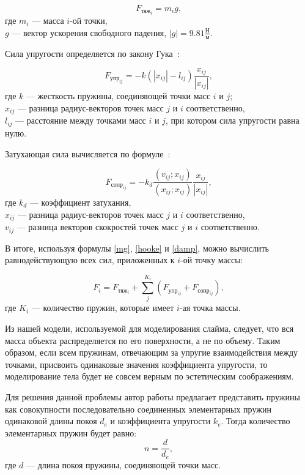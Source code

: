 \begin{equation}\label{mg}
	F_{\text{тяж}_i} = m_i g,
\end{equation}
где $m_i$ --- масса $i$-ой точки,\\
\text{~~~~~~} $g$ --- вектор ускорения свободного падения, $|g| = 9.81 \frac{\text{Н}}{\text{м}}$.

Сила упругости определяется по закону Гука~\cite{muller}:

\begin{equation}\label{hooke}
	F_{\text{упр}_{ij}} = -k (|x_{ij}| - l_{ij}) \frac{x_{ij}}{|x_{ij}|},
\end{equation}
где $k$ --- жесткость пружины, соединяющей точки масс $i$ и $j$;\\
\text{~~~~~~}$x_{ij}$ --- разница радиус-векторов точек масс $j$ и $i$ соответственно,\\
\text{~~~~~~}$l_{ij}$ --- расстояние между точками масс $i$ и $j$, при котором сила упругости равна нулю.

Затухающая сила вычисляется по формуле~\cite{muller}:

\begin{equation}\label{damp}
	F_{\text{сопр}_{ij}} = -k_d \frac{(v_{ij}; x_{ij})}{(x_{ij}; x_{ij})} \frac{x_{ij}}{|x_{ij}|},
\end{equation}
где $k_d$ --- коэффициент затухания,\\
\text{~~~~~~}$x_{ij}$ --- разница радиус-векторов точек масс $j$ и $i$ соответственно,\\
\text{~~~~~~}$v_{ij}$ --- разница векторов скокростей точек масс $j$ и $i$ соответственно.

В итоге, используя формулы \eqref{mg}, \eqref{hooke} и \eqref{damp}, можно вычислить равнодействующую всех сил, приложенных к $i$-ой точку массы:

\begin{equation}\label{f}
	F_i = F_{\text{тяж}_i} + \sum_{j}^{K_i} (F_{\text{упр}_{ij}} + F_{\text{сопр}_{ij}}),
\end{equation}
где $K_i$ --- количество пружин, которые имеет $i$-ая точка массы.

Из нашей модели, используемой для моделирования слайма, следует, что вся масса объекта распределяется по его поверхности, а не по объему. Таким образом, если всем пружинам, отвечающим за упругие взаимодействия между точками, присвоить одинаковые значения коэффициента упругости, то моделирование тела будет не совсем верным по эстетическим соображениям.

Для решения данной проблемы автор работы предлагает представить пружины как совокупности последовательно соединенных элементарных пружин одинаковой длины покоя $d_e$ и коэффициента упругости $k_e$. Тогда количество элементарных пружин будет равно:
\begin{equation}\label{stifn}
	n = \frac{d}{d_e},
\end{equation}
где $d$ --- длина покоя пружины, соединяющей точки масс.


